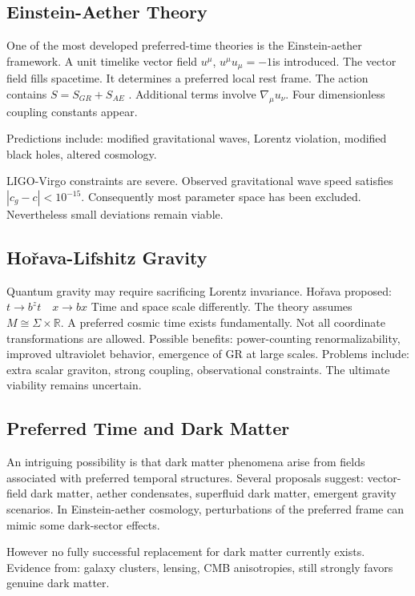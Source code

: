 \subsection{Einstein-Aether Theory}
One of the most developed preferred-time theories is
the Einstein-aether framework.
A unit timelike vector field $ u^\mu $,
 $ u^\mu u_\mu=-1 $is introduced.
The vector field fills spacetime.
It determines a preferred local rest frame.
The action contains $ S=S_{GR}+S_{AE} $ .
Additional terms involve $ \nabla_\mu u_\nu. $
Four dimensionless coupling constants appear.

Predictions include:
modified gravitational waves,
Lorentz violation,
modified black holes,
altered cosmology.

LIGO-Virgo constraints are severe.
Observed gravitational wave speed satisfies $ |c_g -c|< 10^{-15}.$
Consequently most parameter space has been excluded.
Nevertheless small deviations remain viable.

\subsection{Hořava-Lifshitz Gravity}
Quantum gravity may require sacrificing Lorentz invariance.
Hořava proposed:$ t \rightarrow b^z t \quad x \rightarrow b x $
Time and space scale differently.
The theory assumes $ M\cong \Sigma \times \mathbb{R}.$
A preferred cosmic time exists fundamentally.
Not all coordinate transformations are allowed.
Possible benefits:
power-counting renormalizability,
improved ultraviolet behavior,
emergence of GR at large scales.
Problems include:
extra scalar graviton,
strong coupling,
observational constraints.
The ultimate viability remains uncertain.

\subsection{ Preferred Time and Dark Matter}
An intriguing possibility is that dark matter phenomena arise from fields associated with preferred temporal structures.
Several proposals suggest:
vector-field dark matter,
aether condensates,
superfluid dark matter,
emergent gravity scenarios.
In Einstein-aether cosmology, perturbations of the preferred frame can mimic some dark-sector effects.

However no fully successful replacement for dark matter currently exists.
Evidence from:
galaxy clusters,
lensing,
CMB anisotropies,
still strongly favors genuine dark matter.

